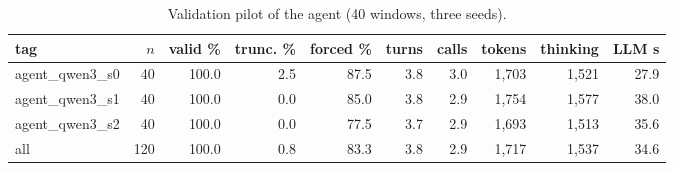 \begin{table}[t]\centering\scriptsize\setlength{\tabcolsep}{3pt}
\caption{Validation pilot of the agent (40 windows, three seeds).}\label{tab:supp_agent_pilot}
\begin{tabular}{lrrrrrrrrr}\toprule
tag & $n$ & valid \% & trunc. \% & forced \% & turns & calls & tokens & thinking & LLM s \\\midrule
agent\_qwen3\_s0 & 40 & 100.0 & 2.5 & 87.5 & 3.8 & 3.0 & 1{,}703 & 1{,}521 & 27.9 \\
agent\_qwen3\_s1 & 40 & 100.0 & 0.0 & 85.0 & 3.8 & 2.9 & 1{,}754 & 1{,}577 & 38.0 \\
agent\_qwen3\_s2 & 40 & 100.0 & 0.0 & 77.5 & 3.7 & 2.9 & 1{,}693 & 1{,}513 & 35.6 \\
all & 120 & 100.0 & 0.8 & 83.3 & 3.8 & 2.9 & 1{,}717 & 1{,}537 & 34.6 \\
\bottomrule\end{tabular}
\end{table}
